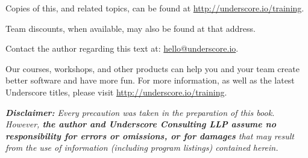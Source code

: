 \begin{center}

Copies of this, and related topics, can be found at \href{http://underscore.io/training}{http://underscore.io/training}.

Team discounts, when available, may also be found at that address.

Contact the author regarding this text at: \href{mailto:hello@underscore.io}{hello@underscore.io}.

\vspace{3em}

Our courses, workshops, and other products can help you and your team create better software and have more fun. For more information, as well as the latest Underscore titles, please visit \href{http://underscore.io/training}{http://underscore.io/training}.

\vspace{3em}

\textit{\textbf{Disclaimer:} Every precaution was taken in the preparation of this book. However, \textbf{the author and Underscore Consulting LLP assume no responsibility for errors or omissions, or for damages} that may result from the use of information (including program listings) contained herein.}

\end{center}

